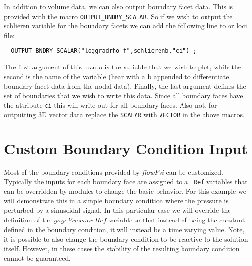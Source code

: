 \documentclass[letterpaper,twoside]{article}
\begin{document}
In addition to volume data, we can also output boundary facet data.
This is provided with the macro {\tt OUTPUT\_BNDRY\_SCALAR}.  So if we
wish to output the schlieren variable for the boundary facets we can
add the following line to or loci file:
\begin{verbatim}
  OUTPUT_BNDRY_SCALAR("loggradrho_f",schlierenb,"ci") ;
\end{verbatim}
The first argument of this macro is the variable that we wish to plot,
while the second is the name of the variable (hear with a b appended
to differentiate boundary facet data from the nodal data).  Finally,
the last argument defines the set of boundaries that we wish to write
this data.  Since all boundary faces have the attribute {\tt ci} this
will write out for all boundary faces.  Also not, for outputting 3D
vector data replace the {\tt SCALAR} with {\tt VECTOR} in the above
macros.
\clearpage
\section{Custom Boundary Condition Input}

Most of the boundary conditions provided by {\it flowPsi} can be customized.
Typically the inputs for each boundary face are assigned to a {\tt
  Ref} variables that can be overridden by modules to change the basic
behavior.   For this example we will demonstrate this in a simple
boundary condition where the pressure is perturbed by a sinusoidal
signal.  In this particular case we will override the definition of
the $gagePressureRef$ variable so that instead of being the constant
defined in the boundary condition, it will instead be a time varying
value.  Note, it is possible to also change the boundary condition to
be reactive to the solution itself.  However, in these cases the
stability of the resulting boundary condition cannot be guaranteed.
\end{document}
